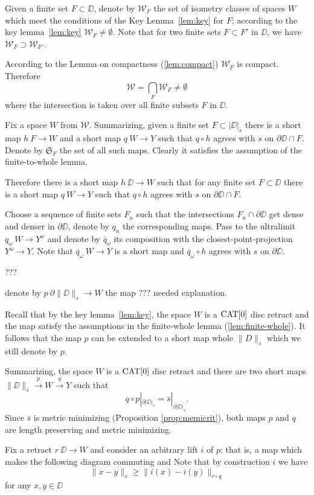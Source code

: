 \documentclass{article}
\begin{document}
Given a finite set $F\subset \DD$,
denote by $\mathcal{W}_F$
the set of isometry classes of spaces $W$ which meet the conditions of the Key Lemma~\ref{lem:key}
for $F$;
according to the key lemma~\ref{lem:key} $\mathcal{W}_F\ne\emptyset$.
Note that for two finite sets $F\subset F'$ in $\DD$,
we have $\mathcal{W}_F\supset \mathcal{W}_{F'}$.

According to the Lemma on compactness (\ref{lem:compact}) $\mathcal{W}_F$ is compact.
Therefore 
\[\mathcal{W}
=
\bigcap_{F}\mathcal{W}_F\ne \emptyset\]
where the intersection is taken over all finite subsets $F$ in $\DD$. 


Fix a space $W$ from $\mathcal{W}$.
Summarizing,
given a finite set $F\subset |\DD|_s$ there is a short map $h\:F\to W$ 
and a short map $q\:W\to Y$ such that $q\circ h$ agrees with $s$ on $\partial\DD\cap F$.
Denote by $\mathfrak{S}_F$ the set of all such maps.
Clearly it satisfies the assumption of the finite-to-whole lemma.

Therefore there is a short map $h\:\DD\to W$ such that for any finite set $F\subset \DD$ there is a short map $q\:W\to Y$ such that $q\circ h$ agrees with $s$ on $\partial \DD\cap F$.

Choose a sequence of finite sets $F_n$ such that the intersections $F_n\cap\partial \DD$ get dense and denser in $\partial \DD$, denote by $q_n$ the corresponding maps.
Pass to the ultralimit $q_\omega\:W\to Y^\omega$ and denote by $\bar q_\omega$ its composition with the closest-point-projection $Y^\omega\to Y$.
Note that $\bar q_\omega\:W\to Y$ is a short map and $\bar q_\omega\circ h$ agrees with $s$ on $\partial \DD$.

???


denote by $p\:\partial \|\DD\|_s\to W$ the map ??? needed explanation.

Recall that by the key lemma~\ref{lem:key}, the space $W$ is a $\mathop{\rm CAT}\nolimits[0]$ disc retract
and the map  satisfy the assumptions in the finite-whole lemma (\ref{lem:finite-whole}).
It follows that the map $p$ can be extended to a short map whole $\|D\|_s$ which we still denote by $p$.

Summarizing, the space $W$ is a $\mathop{\rm CAT}\nolimits[0]$ disc retract and
 there are two short maps 
$\|\DD\|_s\xrightarrow{p} W \xrightarrow{q} Y$
such that 
\[q\circ p|_{\partial|\DD|_s}=\bar s|_{\partial|\DD|_s}.\] 
Since $\bar s$ is metric minimizing (Proposition \ref{prop:memicrit}), both maps $p$ and $q$ are length preserving and metric minimizing.

Fix a retract $r\:\DD\to W$ and consider an arbitrary lift $i$ of $p$;
that is, a map which makes the following diagram commuting and 
Note that by construction $i$ we have
\[\|x-y\|_s\ge \|i(x)-i(y)\|_{r\circ q}\]
for any $x,y\in \DD$
\end{document}
